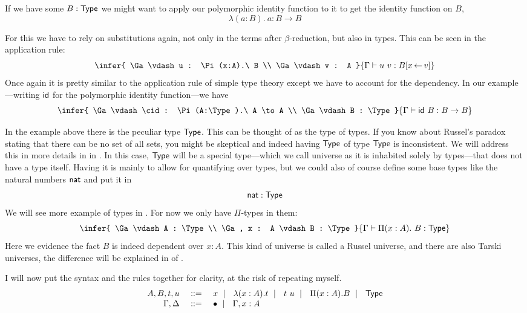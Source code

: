 If we have some \(B : \mathsf{Type}\) we might want to apply our polymorphic identity
function to it to get the identity function on \(B\), \ie
\[
  \lambda (a:B).\ a : B \to B
\]

For this we have to rely on substitutions again, not only in the terms after
\(\beta\)-reduction, but also in types.
This can be seen in the application rule:
\[
  \infer
    {
      \Ga \vdash u : \Pi (x:A).\ B \\
      \Ga \vdash v : A
    }
    {\Ga \vdash u\ v : B[x \sto v]}
\]
Once again it is pretty similar to the application rule of simple type theory
except we have to account for the dependency. In our example---writing \(\mathsf{id}\)
for the polymorphic identity function---we have
\[
  \infer
    {
      \Ga \vdash \cid : \Pi (A:\Type).\ A \to A \\
      \Ga \vdash B : \Type
    }
    {\Ga \vdash \cid\ B : B \to B}
\]


In the example above there is the peculiar type \(\mathsf{Type}\).
This can be thought of as the type of types. If you know about Russel's paradox
stating that there can be no set of all sets, you might be skeptical and indeed
having \(\mathsf{Type}\) of type \(\mathsf{Type}\) is inconsistent.
We will address this in more details in  in
.
In this case, \(\mathsf{Type}\) will be a special type---which we call universe as it
is inhabited solely by types---that does not have a type itself.
Having it is mainly to allow for quantifying over types, but we could also of
course define some base types like the natural numbers \(\mathsf{nat}\) and put it in
\[
  \mathsf{nat} : \mathsf{Type}
\]
We will see more example of types in . For now we only have
\(\Pi\)-types in them:
\[
  \infer
    {
      \Ga \vdash A : \Type \\
      \Ga, x : A \vdash B : \Type
    }
    {\Ga \vdash \Pi (x:A).\ B : \Type}
\]
Here we evidence the fact \(B\) is indeed dependent over \(x : A\).
This kind of universe is called a Russel universe, and there are also Tarski
universes, the difference will be explained in 
of .

I will now put the syntax and the rules together for clarity, at the risk of
repeating myself.
\[
  \begin{array}{rcl}
    A, B, t, u &\ \mathrel{{:}{:}{=}}\ & x \ \mid\ \  \lambda (x:A).t \ \mid\ \  t\ u \ \mid\ \  \Pi (x:A). B
    \ \mid\ \  \mathsf{Type} \\
    \Gamma, \Delta &\ \mathrel{{:}{:}{=}}\ & \bullet \ \mid\ \  \Gamma, x:A
  \end{array}
\]

